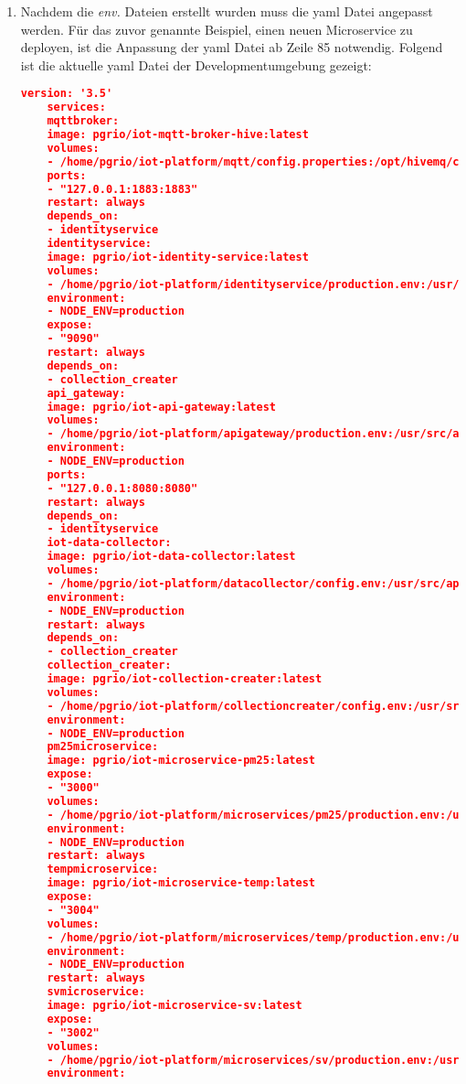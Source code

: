 \begin{enumerate}
\begin{itemize}
		\item SERVICE\_HOST: Entspricht dem Namen des Microservices in der yaml Datei und ist notwendig, damit das API Gateway die Anfragen, an der richtigen Microservice weiterleiten kann
	\end{itemize}
	\item Nachdem die \textit{env.} Dateien erstellt wurden muss die yaml Datei angepasst werden. Für das zuvor genannte Beispiel, einen neuen Microservice zu deployen, ist die Anpassung der yaml Datei ab Zeile 85 notwendig. Folgend ist die aktuelle yaml Datei der Developmentumgebung gezeigt: \newline
	\begin{lstlisting}[language=json]
	version: '3.5'
	services:
	mqttbroker:
	image: pgrio/iot-mqtt-broker-hive:latest
	volumes:
	- /home/pgrio/iot-platform/mqtt/config.properties:/opt/hivemq/config.properties
	ports:
	- "127.0.0.1:1883:1883"
	restart: always
	depends_on:
	- identityservice
	identityservice:
	image: pgrio/iot-identity-service:latest
	volumes:
	- /home/pgrio/iot-platform/identityservice/production.env:/usr/src/app/production.env
	environment:
	- NODE_ENV=production
	expose:
	- "9090"
	restart: always
	depends_on:
	- collection_creater
	api_gateway:
	image: pgrio/iot-api-gateway:latest
	volumes:
	- /home/pgrio/iot-platform/apigateway/production.env:/usr/src/app/production.env
	environment:
	- NODE_ENV=production
	ports:
	- "127.0.0.1:8080:8080"
	restart: always
	depends_on:
	- identityservice
	iot-data-collector:
	image: pgrio/iot-data-collector:latest
	volumes:
	- /home/pgrio/iot-platform/datacollector/config.env:/usr/src/app/config.env
	environment:
	- NODE_ENV=production
	restart: always
	depends_on:
	- collection_creater
	collection_creater:
	image: pgrio/iot-collection-creater:latest
	volumes:
	- /home/pgrio/iot-platform/collectioncreater/config.env:/usr/src/app/config.env
	environment:
	- NODE_ENV=production
	pm25microservice:
	image: pgrio/iot-microservice-pm25:latest
	expose:
	- "3000"
	volumes:
	- /home/pgrio/iot-platform/microservices/pm25/production.env:/usr/src/app/production.env
	environment:
	- NODE_ENV=production
	restart: always
	tempmicroservice:
	image: pgrio/iot-microservice-temp:latest
	expose:
	- "3004"
	volumes:
	- /home/pgrio/iot-platform/microservices/temp/production.env:/usr/src/app/production.env
	environment:
	- NODE_ENV=production
	restart: always
	svmicroservice:
	image: pgrio/iot-microservice-sv:latest
	expose:
	- "3002"
	volumes:
	- /home/pgrio/iot-platform/microservices/sv/production.env:/usr/src/app/production.env
	environment:

\end{lstlisting}
\end{enumerate}
